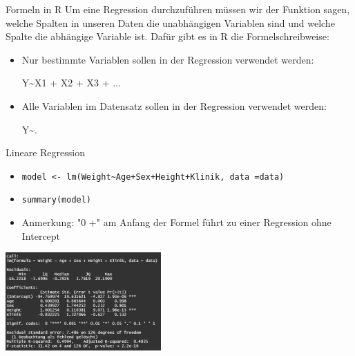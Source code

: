 \documentclass[aspectratio = 169]{chariteBeamer}
\begin{document}
\begin{frame}[fragile]{Formeln in R}
	Um eine Regression durchzuführen müssen wir der Funktion sagen, welche Spalten in unseren Daten die unabhängigen Variablen sind und welche Spalte die abhängige Variable ist. Dafür gibt	es in R die Formelschreibweise:
	\begin{itemize}
		\item Nur bestimmte Variablen sollen in der Regression verwendet werden:
			\begin{center}
				Y\textasciitilde X1 + X2 + X3 + ... 
			\end{center}
		\item Alle Variablen im Datensatz sollen in der Regression verwendet werden:
			\begin{center}
				Y\textasciitilde.
			\end{center}
	\end{itemize}
\end{frame}



\begin{frame}[fragile]{Lineare Regression}
	\begin{itemize}
		\item \verb"model <- lm(Weight~Age+Sex+Height+Klinik, data =data)"
		\item \verb+summary(model)+
		\item Anmerkung: "0 +" am Anfang der Formel führt zu einer Regression ohne Intercept 
	\end{itemize}
			
	\begin{center}
		\includegraphics[height=3.75cm]{LinearRegressionSummary}
	\end{center}
\end{frame}
\end{document}
